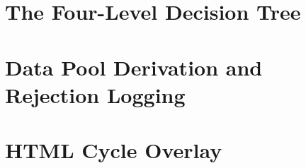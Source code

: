 \section{The Four-Level Decision Tree}
\label{sec:Methodik_DecisionTree}

\section{Data Pool Derivation and Rejection Logging}
\label{sec:Methodik_DataPool}

\section{HTML Cycle Overlay}
\label{sec:Methodik_HTMLOverlay}

